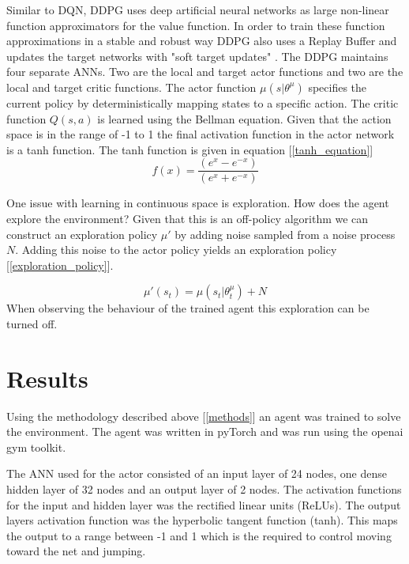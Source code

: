 \documentclass[12pt]{article}
\begin{document}
Similar to DQN, DDPG uses deep artificial neural networks as large non-linear function approximators for the value function.
In order to train these function approximations in a stable and robust way DDPG also uses a Replay Buffer\cite{experience_replay} and updates the target networks with "soft target updates" \cite{ddpg_paper}.
The DDPG maintains four separate ANNs.
Two are the local and target actor functions and two are the local and target critic functions.
The actor function $\mu(s|\theta^{\mu})$ specifies the current policy by deterministically mapping states to a specific action.
The critic function $Q(s,a)$ is learned using the Bellman equation.
Given that the action space is in the range of -1 to 1 the final activation function in the actor network is a tanh function.
The tanh function is given in equation [\ref{tanh_equation}]
\begin{equation}
\label{tanh_equation}
f(x) = \frac{(e^x - e^{-x})}{(e^x+e^{-x})}
\end{equation}

One issue with learning in continuous space is exploration.
How does the agent explore the environment?
Given that this is an off-policy algorithm we can construct an exploration policy $\mu'$ by adding noise sampled from a noise process $N$.
Adding this noise to the actor policy yields an exploration policy [\ref{exploration_policy}].

\begin{equation}
\label{exploration_policy}
\mu'(s_t) = \mu(s_t|\theta_t^\mu) + N
\end{equation}
When observing the behaviour of the trained agent this exploration can be turned off.

\section{Results}
Using the methodology described above [\ref{methods}] an agent was trained to solve the environment.
The agent was written in pyTorch and was run using the openai gym toolkit.

The ANN used for the actor consisted of an input layer of 24 nodes, one dense hidden layer of 32 nodes and an output layer of 2 nodes.
The activation functions for the input and hidden layer was the rectified linear units (ReLUs). 
The output layers activation function was the hyperbolic tangent function (tanh). 
This maps the output to a range between -1 and 1 which is the required to control moving toward the net and jumping.
\end{document}

